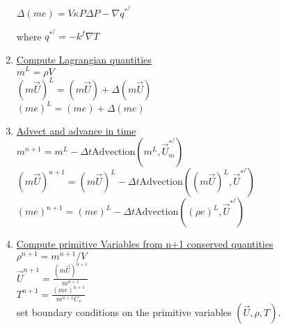 \documentclass[fleqn]{article}
\newcommand{\U}         {{\vec{U}}}
\newcommand{\delt}      {\ensuremath{\Delta{t}} }
\begin{document}
\begin{enumerate}
 $\Delta(me) =  
    V \kappa P \Delta{P}
    - \nabla q^{*^f}$

where $q^{*^f} = -k^f \nabla T$
%
\item \underline{Compute Lagrangian quantities}\\
    $m^L     = {\rho}V$ \\
    $(m\U)^L = (m\U) + \Delta(m\U)$ \\
    $(m e)^L = (m e) + \Delta(m e)$ \\
%

\item \underline{Advect and advance in time}\\
$ m^{n+1}     = m^L 
                  - \delt\text{Advection}(m^L, \U_ m^{*^{f}})$ \\
$(m \U)^{n+1} = (m \U)^L 
                   - \delt\text{Advection}((m \U)^L, \vec{U}^{*^{f}})$\\
$(me)^{n+1}   = (me)^L       
                   - \delt\text{Advection}((\rho  e)^L, \vec{U}^{*^{f}})$\\ %
\item \underline{Compute primitive Variables from n+1 conserved quantities}\\
$ \rho^{n+1} =  m^{n+1}/V$\\
%
$\U^{n+1} = \frac{(m \U)^{n+1} }{ m^{n+1} }$\\
%
$T^{n+1} = \frac{(me)^{n+1} }{ m^{n+1} C_v }$ \\

set boundary conditions on the primitive variables $(\U, \rho, T)$.
\end{enumerate}
\end{document}

